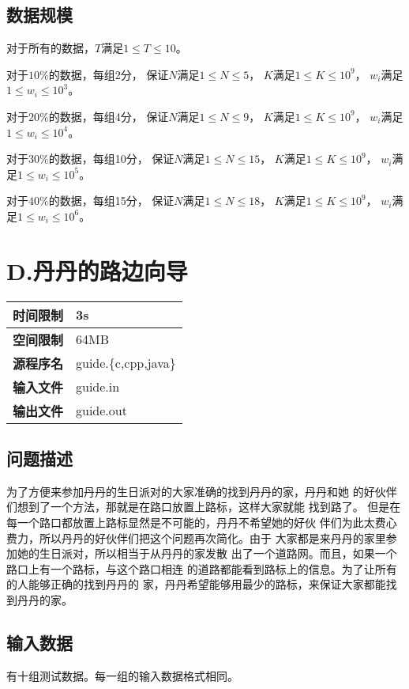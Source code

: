 \documentclass{article}
\begin{document}
\subsection*{数据规模}
对于所有的数据，$T$满足$1 \leq T \leq 10$。

对于$10\%$的数据，每组2分，
保证$N$满足$1 \leq N \leq 5$，
$K$满足$1 \leq K \leq 10^{9}$，
$w_i$满足$1 \leq w_i \leq 10^{3}$。

对于$20\%$的数据，每组4分，
保证$N$满足$1 \leq N \leq 9$，
$K$满足$1 \leq K \leq 10^{9}$，
$w_i$满足$1 \leq w_i \leq 10^{4}$。

对于$30\%$的数据，每组10分，
保证$N$满足$1 \leq N \leq 15$，
$K$满足$1 \leq K \leq 10^{9}$，
$w_i$满足$1 \leq w_i \leq 10^{5}$。

对于$40\%$的数据，每组15分，
保证$N$满足$1 \leq N \leq 18$，
$K$满足$1 \leq K \leq 10^{9}$，
$w_i$满足$1 \leq w_i \leq 10^{6}$。

\clearpage

\section*{D.丹丹的路边向导}
\begin{longtable}{|c|l|}
 \hline \bfseries{时间限制} & 3s \\
 \hline \bfseries{空间限制} & 64MB \\
 \hline \bfseries{源程序名} & guide.\{c,cpp,java\} \\
 \hline \bfseries{输入文件} & guide.in \\
 \hline \bfseries{输出文件} & guide.out \\
 \hline 
\end{longtable}

\subsection*{问题描述}
为了方便来参加丹丹的生日派对的大家准确的找到丹丹的家，丹丹和她
的好伙伴们想到了一个方法，那就是在路口放置上路标，这样大家就能
找到路了。
但是在每一个路口都放置上路标显然是不可能的，丹丹不希望她的好伙
伴们为此太费心费力，所以丹丹的好伙伴们把这个问题再次简化。由于
大家都是来丹丹的家里参加她的生日派对，所以相当于从丹丹的家发散
出了一个道路网。而且，如果一个路口上有一个路标，与这个路口相连
的道路都能看到路标上的信息。为了让所有的人能够正确的找到丹丹的
家，丹丹希望能够用最少的路标，来保证大家都能找到丹丹的家。

\subsection*{输入数据}
有十组测试数据。每一组的输入数据格式相同。
\end{document}
